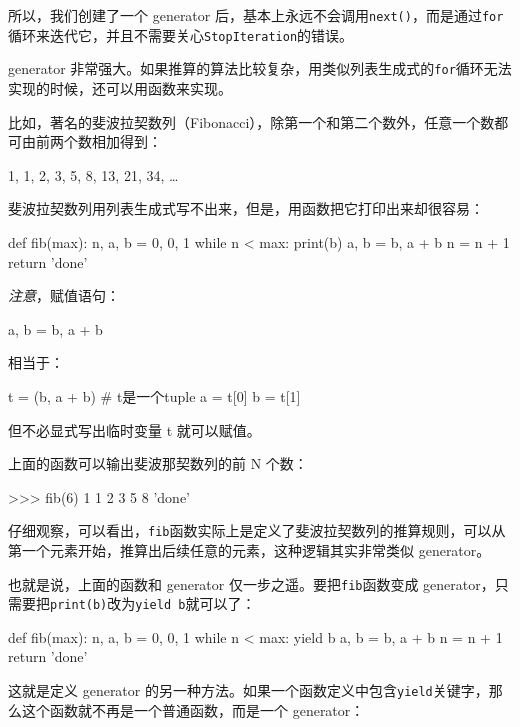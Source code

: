 所以，我们创建了一个 generator
后，基本上永远不会调用\texttt{next()}，而是通过\texttt{for}循环来迭代它，并且不需要关心\texttt{StopIteration}的错误。

generator
非常强大。如果推算的算法比较复杂，用类似列表生成式的\texttt{for}循环无法实现的时候，还可以用函数来实现。

比如，著名的斐波拉契数列（Fibonacci），除第一个和第二个数外，任意一个数都可由前两个数相加得到：

1, 1, 2, 3, 5, 8, 13, 21, 34, \ldots{}

斐波拉契数列用列表生成式写不出来，但是，用函数把它打印出来却很容易：

\begin{pythoncode}
def fib(max):
    n, a, b = 0, 0, 1
    while n < max:
        print(b)
        a, b = b, a + b
        n = n + 1
    return 'done'
\end{pythoncode}

\emph{注意}，赋值语句：

\begin{pythoncode}
a, b = b, a + b
\end{pythoncode}

相当于：

\begin{pythoncode}
t = (b, a + b) # t是一个tuple
a = t[0]
b = t[1]
\end{pythoncode}

但不必显式写出临时变量 t 就可以赋值。

上面的函数可以输出斐波那契数列的前 N 个数：

\begin{pythoncode}
>>> fib(6)
1
1
2
3
5
8
'done'
\end{pythoncode}

仔细观察，可以看出，\texttt{fib}函数实际上是定义了斐波拉契数列的推算规则，可以从第一个元素开始，推算出后续任意的元素，这种逻辑其实非常类似
generator。

也就是说，上面的函数和 generator 仅一步之遥。要把\texttt{fib}函数变成
generator，只需要把\texttt{print(b)}改为\texttt{yield\ b}就可以了：

\begin{pythoncode}
def fib(max):
    n, a, b = 0, 0, 1
    while n < max:
        yield b
        a, b = b, a + b
        n = n + 1
    return 'done'
\end{pythoncode}

这就是定义 generator
的另一种方法。如果一个函数定义中包含\texttt{yield}关键字，那么这个函数就不再是一个普通函数，而是一个
generator：

